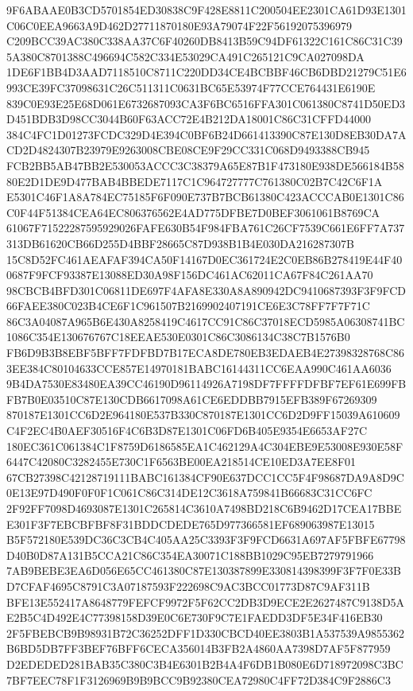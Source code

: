 \documentclass[UTF8,fontset=fandol,zihao=-4,a4paper]{ctexart}
\begin{document}
{{9F6ABAAE0B3CD5701854ED30838C9F428E8811C200504EE2301CA61D93E1301C06C0EEA9663A9D462D27711870180E93A79074F22F56192075396979
C209BCC39AC380C338AA37C6F40260DB8413B59C94DF61322C161C86C31C395A380C8701388C496694C582C334E53029CA491C265121C9CA027098DA
1DE6F1BB4D3AAD7118510C8711C220DD34CE4BCBBF46CB6DBD21279C51E6993CE39FC37098631C26C511311C0631BC65E53974F77CCE764431E6190E
839C0E93E25E68D061E6732687093CA3F6BC6516FFA301C061380C8741D50ED3D451BDB3D98CC3044B60F63ACC72E4B212DA18001C86C31CFFD44000
384C4FC1D01273FCDC329D4E394C0BF6B24D661413390C87E130D8EB30DA7ACD2D4824307B23979E9263008CBE08CE9F29CC331C068D9493388CB945
FCB2BB5AB47BB2E530053ACCC3C38379A65E87B1F473180E938DE566184B5880E2D1DE9D477BAB4BBEDE7117C1C964727777C761380C02B7C42C6F1A
E5301C46F1A8A784EC75185F6F090E737B7BCB61380C423ACCCAB0E1301C86C0F44F51384CEA64EC806376562E4AD775DFBE7D0BEF3061061B8769CA
61067F71522287595929026FAFE630B54F984FBA761C26CF7539C661E6FF7A737313DB61620CB66D255D4BBF28665C87D938B1B4E030DA216287307B
15C8D52FC461AEAFAF394CA50F14167D0EC361724E2C0EB86B278419E44F400687F9FCF93387E13088ED30A98F156DC461AC62011CA67F84C261AA70
98CBCB4BFD301C06811DE697F4AFA8E330A8A890942DC9410687393F3F9FCD66FAEE380C023B4CE6F1C961507B2169902407191CE6E3C78FF7F7F71C
86C3A04087A965B6E430A8258419C4617CC91C86C37018ECD5985A06308741BC1086C354E130676767C18EEAE530E0301C86C3086134C38C7B1576B0
FB6D9B3B8EBF5BFF7FDFBD7B17ECA8DE780EB3EDAEB4E27398328768C863EE384C80104633CCE857E14970181BABC16144311CC6EAA990C461AA6036
9B4DA7530E83480EA39CC46190D96114926A7198DF7FFFFDFBF7EF61E699FBFB7B0E03510C87E130CDB6617098A61CE6EDDBB7915EFB389F67269309
870187E1301CC6D2E964180E537B330C870187E1301CC6D2D9FF15039A610609C4F2EC4B0AEF30516F4C6B3D87E1301C06FD6B405E9354E6653AF27C
180EC361C061384C1F8759D6186585EA1C462129A4C304EBE9E53008E930E58F6447C42080C3282455E730C1F6563BE00EA218514CE10ED3A7EE8F01
67CB27398C42128719111BABC161384CF90E637DCC1CC5F4F98687DA9A8D9C0E13E97D490F0F0F1C061C86C314DE12C3618A759841B66683C31CC6FC
2F92FF7098D4693087E1301C265814C3610A7498BD218C6B9462D17CEA17BBEE301F3F7EBCBFBF8F31BDDCDEDE765D977366581EF689063987E13015
B5F572180E539DC36C3CB4C405AA25C3393F3F9FCD6631A697AF5FBFE67798D40B0D87A131B5CCA21C86C354EA30071C188BB1029C95EB7279791966
7AB9BEBE3EA6D056E65CC461380C87E130387899E330814398399F3F7F0E33BD7CFAF4695C8791C3A07187593F222698C9AC3BCC01773D87C9AF311B
BFE13E552417A8648779FEFCF9972F5F62CC2DB3D9ECE2E2627487C9138D5AE2B5C4D492E4C77398158D39E0C6E730F9C7E1FAEDD3DF5E34F416EB30
2F5FBEBCB9B98931B72C36252DFF1D330CBCD40EE3803B1A537539A9855362B6BD5DB7FF3BEF76BFF6CECA356014B3FB2A4860AA7398D7AF5F877959
D2EDEDED281BAB35C380C3B4E6301B2B4A4F6DB1B080E6D718972098C3BC7BF7EEC78F1F3126969B9B9BCC9B92380CEA72980C4FF72D384C9F2886C3
}}
\end{document}
